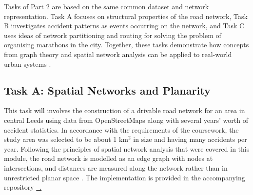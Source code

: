 \documentclass[acmsmall,nonacm,natbib=false]{acmart}
\newcommand{\githublink}[2]{\href{#1}{\faGithub\ #2}}
\begin{document}
Tasks of Part 2 are based on the same common dataset and network representation.  Task A focuses on structural properties of the road network, Task B investigates accident patterns as events occurring on the network, and  Task C uses ideas of network partitioning and routing for solving the problem of organising marathons in the city. Together, these tasks demonstrate how concepts from graph theory and spatial network analysis can be applied to real-world urban systems \cite{easley2010networks}.

\subsection{\LARGE{Task A: Spatial Networks and Planarity}}
\leavevmode \par \noindent
This task will involves the construction of a drivable road network for an area in central Leeds using data from OpenStreetMaps along with several years' worth of accident statistics. In accordance with the requirements of the coursework, the study area was selected to be about 1 km$^2$ in size and having many accidents per year. Following the principles of spatial network analysis that were covered in this module, the road network is modelled as an edge graph with nodes at intersections, and distances are measured along the network rather than in unrestricted planar space \cite{okabe2000spatial,boeing2017osmnx}.  The implementation is provided in the accompanying repository \githublink{https://github.kcl.ac.uk/k25038453/network-data-analysis-coursework/blob/main/notebooks/part\_2/taskA.ipynb}.
\end{document}
